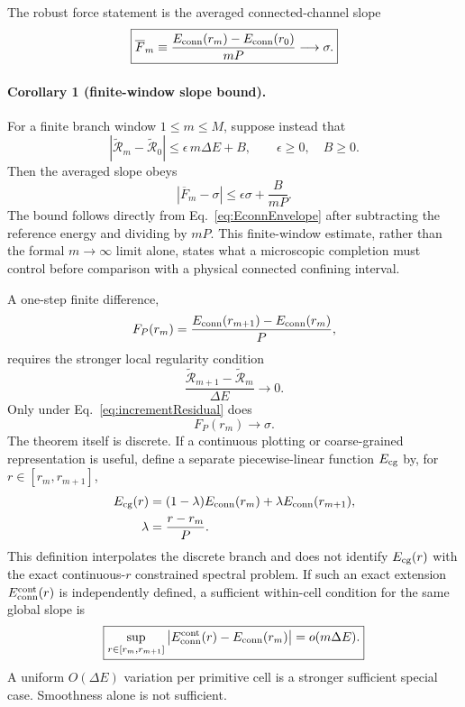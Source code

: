 \documentclass[10pt]{article}
\begin{document}
The robust force statement is the averaged connected-channel slope
\begin{equation}
\boxed{
\overline F_m
\equiv
\frac{E_{\rm conn}(r_m)-E_{\rm conn}(r_0)}{mP}
\longrightarrow\sigma.
}
\label{eq:avgForce}
\end{equation}

\paragraph{Corollary 1 (finite-window slope bound).}
For a finite branch window $1\le m\le M$, suppose instead that
\begin{equation}
\left|\widetilde{\mathcal R}_m-\widetilde{\mathcal R}_0\right|
\le \epsilon\,m\Delta E+B,
\qquad \epsilon\ge0,\quad B\ge0.
\label{eq:finiteWindowAssumption}
\end{equation}
Then the averaged slope obeys
\begin{equation}
\boxed{
\left|\overline F_m-\sigma\right|
\le \epsilon\sigma+\frac{B}{mP}.
}
\label{eq:finiteWindowBound}
\end{equation}
The bound follows directly from Eq.~\eqref{eq:EconnEnvelope} after subtracting the reference energy and dividing by $mP$. This finite-window estimate, rather than the formal $m\to\infty$ limit alone, states what a microscopic completion must control before comparison with a physical connected confining interval.

A one-step finite difference,
\begin{equation}
F_P(r_m)=
\frac{E_{\rm conn}(r_{m+1})-E_{\rm conn}(r_m)}{P},
\label{eq:finiteForce}
\end{equation}
requires the stronger local regularity condition
\begin{equation}
\boxed{
\frac{\widetilde{\mathcal R}_{m+1}-\widetilde{\mathcal R}_m}{\Delta E}
\longrightarrow0.
}
\label{eq:incrementResidual}
\end{equation}
Only under Eq.~\eqref{eq:incrementResidual} does
\begin{equation}
\boxed{F_P(r_m)\longrightarrow\sigma.}
\label{eq:force}
\end{equation}
The theorem itself is discrete. If a continuous plotting or coarse-grained representation is useful, define a separate piecewise-linear function $E_{\rm cg}$ by, for $r\in[r_m,r_{m+1}]$,
\begin{align}
E_{\rm cg}(r)
&=(1-\lambda)E_{\rm conn}(r_m)
 +\lambda E_{\rm conn}(r_{m+1}), \notag\\
\lambda&=\frac{r-r_m}{P}.
\label{eq:Ecg}
\end{align}
This definition interpolates the discrete branch and does not identify $E_{\rm cg}(r)$ with the exact continuous-$r$ constrained spectral problem. If such an exact extension $E_{\rm conn}^{\rm cont}(r)$ is independently defined, a sufficient within-cell condition for the same global slope is
\begin{equation}
\boxed{
\sup_{r\in[r_m,r_{m+1}]}
\left|E_{\rm conn}^{\rm cont}(r)-E_{\rm conn}(r_m)\right|
=o(m\Delta E).
}
\label{eq:withinCell}
\end{equation}
A uniform $O(\!\Delta E)$ variation per primitive cell is a stronger sufficient special case. Smoothness alone is not sufficient.
\end{document}
